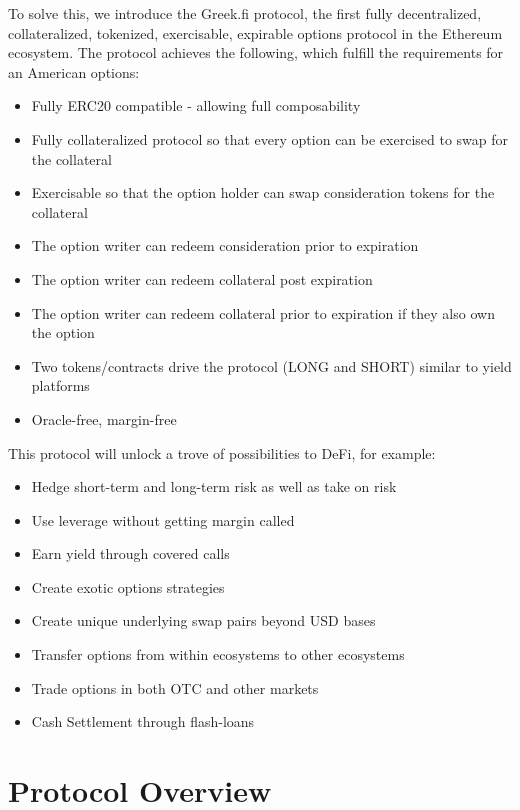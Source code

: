 \documentclass[%
 reprint,
 amsmath,amssymb,
 aps,
]{revtex4-2}
\newcommand{\greekfi}{Greek.fi }
\begin{document}
To solve this, we introduce the \greekfi protocol, the first fully decentralized, collateralized, tokenized, exercisable, expirable options protocol in the Ethereum ecosystem.
The protocol achieves the following, which fulfill the requirements for an American options:
\begin{itemize}
  \setlength{\itemsep}{0pt}
  \setlength{\parskip}{0pt}
  \item Fully ERC20 compatible - allowing full composability
  \item Fully collateralized protocol so that every option can be exercised to swap for the collateral
  \item Exercisable so that the option holder can swap consideration tokens for the collateral
  \item The option writer can redeem consideration prior to expiration
  \item The option writer can redeem collateral post expiration
  \item The option writer can redeem collateral prior to expiration if they also own the option
  \item Two tokens/contracts drive the protocol (LONG and SHORT) similar to yield platforms
  \item Oracle-free, margin-free
\end{itemize}

This protocol will unlock a trove of possibilities to DeFi, for example:

\begin{itemize}
  \setlength{\itemsep}{0pt}
  \setlength{\parskip}{0pt}
  \item Hedge short-term and long-term risk as well as take on risk
  \item Use leverage without getting margin called
  \item Earn yield through covered calls
  \item Create exotic options strategies
  \item Create unique underlying swap pairs beyond USD bases
  \item Transfer options from within ecosystems to other ecosystems
  \item Trade options in both OTC and other markets
  \item Cash Settlement through flash-loans
\end{itemize}

\section{\label{sec:protocol}Protocol Overview}
\end{document}
